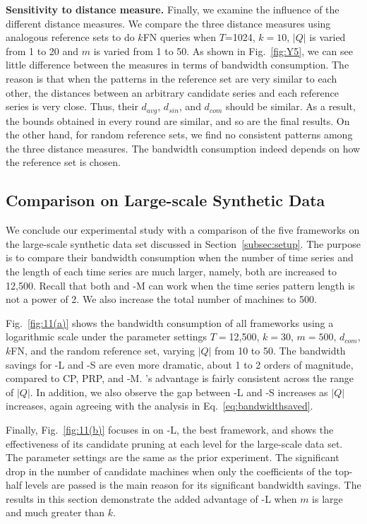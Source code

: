 \textbf{Sensitivity to distance measure.} 
Finally, we examine the influence of the different distance
measures. We compare the three distance measures using analogous
reference sets to do $k$FN queries when $T$=1024, $k=10$, $|Q|$ is
varied from 1 to 20 and $m$ is varied from 1 to 50. As shown in
Fig.~\ref{fig:Y5}, we can see little difference between the measures
in terms of bandwidth consumption. The reason is that when the patterns in the
reference set are very similar to each other, the distances between
an arbitrary candidate series and each reference series is very
close. Thus, their $d_{avg}$, $d_{sin}$, and $d_{com}$ should be
similar. As a result, the bounds obtained in every round are similar,
and so are the final results. On the other hand, for random reference
sets, we find no consistent patterns among the three distance
measures. The bandwidth consumption indeed depends on how the reference
set is chosen.


\subsection{Comparison on Large-scale Synthetic Data}

We conclude our experimental study with a comparison of the five
frameworks on the large-scale synthetic data set discussed in
Section~\ref{subsec:setup}.  The purpose is to compare their bandwidth
consumption when the number of time series and the length of each time
series are much larger, namely, both are increased to 12,500.  Recall
that both \MSWave{} and \LeeWave-M{} can work when the time series
pattern length is not a power of 2. We also increase the total number
of machines to 500.

Fig.~\ref{fig:11(a)} shows the bandwidth consumption of all frameworks
using a logarithmic scale under the parameter settings $T=$12,500,
$k=30$, $m=500$, $d_{com}$, $k$FN, and the random reference set,
varying $|Q|$ from 10 to 50. The bandwidth savings for \MSWave-L{} and 
\MSWave-S{} are even more dramatic, about 1 to 2 orders of magnitude,
compared to CP, PRP, and \LeeWave-M{}. \MSWave{}'s advantage is fairly
consistent across the range of $|Q|$.  In addition, we also
observe the gap between \MSWave-L{} and \MSWave-S{} increases as
$|Q|$ increases, again agreeing with the analysis in Eq.~\eqref{eq:bandwidthsaved}.

Finally, Fig.~\ref{fig:11(b)} focuses in on \MSWave-L{}, the best
framework, and shows the effectiveness of its candidate pruning at
each level for the large-scale data set. The parameter settings are
the same as the prior experiment. The significant drop in the number
of candidate machines when only the coefficients of the top-half
levels are passed is the main reason for its significant bandwidth
savings. The results in this section demonstrate the added advantage of
\MSWave-L{} when $m$ is large and much greater than $k$.

